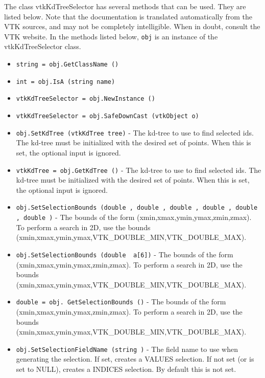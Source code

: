 The class vtkKdTreeSelector has several methods that can be used.
  They are listed below.
Note that the documentation is translated automatically from the VTK sources,
and may not be completely intelligible.  When in doubt, consult the VTK website.
In the methods listed below, \verb|obj| is an instance of the vtkKdTreeSelector class.
\begin{itemize}
\item  \verb|string = obj.GetClassName ()|

\item  \verb|int = obj.IsA (string name)|

\item  \verb|vtkKdTreeSelector = obj.NewInstance ()|

\item  \verb|vtkKdTreeSelector = obj.SafeDownCast (vtkObject o)|

\item  \verb|obj.SetKdTree (vtkKdTree tree)| -  The kd-tree to use to find selected ids.
 The kd-tree must be initialized with the desired set of points.
 When this is set, the optional input is ignored.

\item  \verb|vtkKdTree = obj.GetKdTree ()| -  The kd-tree to use to find selected ids.
 The kd-tree must be initialized with the desired set of points.
 When this is set, the optional input is ignored.

\item  \verb|obj.SetSelectionBounds (double , double , double , double , double , double )| -  The bounds of the form (xmin,xmax,ymin,ymax,zmin,zmax).
 To perform a search in 2D, use the bounds
 (xmin,xmax,ymin,ymax,VTK\_DOUBLE\_MIN,VTK\_DOUBLE\_MAX).

\item  \verb|obj.SetSelectionBounds (double  a[6])| -  The bounds of the form (xmin,xmax,ymin,ymax,zmin,zmax).
 To perform a search in 2D, use the bounds
 (xmin,xmax,ymin,ymax,VTK\_DOUBLE\_MIN,VTK\_DOUBLE\_MAX).

\item  \verb|double = obj. GetSelectionBounds ()| -  The bounds of the form (xmin,xmax,ymin,ymax,zmin,zmax).
 To perform a search in 2D, use the bounds
 (xmin,xmax,ymin,ymax,VTK\_DOUBLE\_MIN,VTK\_DOUBLE\_MAX).

\item  \verb|obj.SetSelectionFieldName (string )| -  The field name to use when generating the selection.
 If set, creates a VALUES selection.
 If not set (or is set to NULL), creates a INDICES selection.
 By default this is not set.


\end{itemize}
